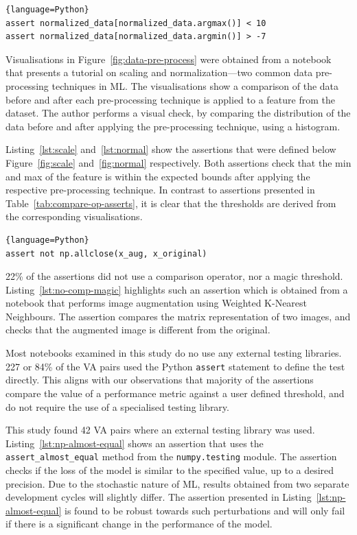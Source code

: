 \documentclass[conference]{IEEEtran}
\begin{document}
\begin{lstlisting}[caption={Similar premise as Listing~\ref{lst:scale}, however this assertion is based on Figure~\ref{fig:normal}.}, label={lst:normal}]{language=Python}
assert normalized_data[normalized_data.argmax()] < 10
assert normalized_data[normalized_data.argmin()] > -7
\end{lstlisting}

Visualisations in Figure~\ref{fig:data-pre-process} were obtained from a notebook that presents a tutorial on scaling and normalization---two common data pre-processing techniques in ML. The visualisations show a comparison of the data before and after each pre-processing technique is applied to a feature from the dataset. The author performs a visual check, by comparing the distribution of the data before and after applying the pre-processing technique, using a histogram.

Listing~\ref{lst:scale} and~\ref{lst:normal} show the assertions that were defined below Figure~\ref{fig:scale} and~\ref{fig:normal} respectively. Both assertions check that the min and max of the feature is within the expected bounds after applying the respective pre-processing technique. In contrast to assertions presented in Table~\ref{tab:compare-op-asserts}, it is clear that the thresholds are derived from the corresponding visualisations.

\begin{lstlisting}[caption={Assertion to check that an augmented image is different from the original.}, label={lst:no-comp-magic}]{language=Python}
assert not np.allclose(x_aug, x_original)
\end{lstlisting}

22\% of the assertions did not use a comparison operator, nor a magic threshold. Listing~\ref{lst:no-comp-magic} highlights such an assertion which is obtained from a notebook that performs image augmentation using Weighted K-Nearest Neighbours. The assertion compares the matrix representation of two images, and checks that the augmented image is different from the original.

Most notebooks examined in this study do no use any external testing libraries. 227 or 84\% of the VA pairs used the Python \texttt{assert} statement to define the test directly. This aligns with our observations that majority of the assertions compare the value of a performance metric against a user defined threshold, and do not require the use of a specialised testing library. 

This study found 42 VA pairs where an external testing library was used. Listing~\ref{lst:np-almost-equal} shows an assertion that uses the \texttt{assert\_almost\_equal} method from the \texttt{numpy.testing} module. The assertion checks if the loss of the model is similar to the specified value, up to a desired precision. Due to the stochastic nature of ML, results obtained from two separate development cycles will slightly differ. The assertion presented in Listing~\ref{lst:np-almost-equal} is found to be robust towards such perturbations and will only fail if there is a significant change in the performance of the model.
\end{document}
